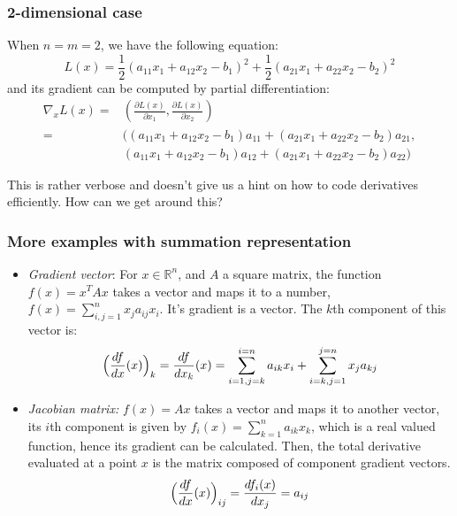 \documentclass{beamer}
\begin{document}
\begin{frame}
\frametitle{2-dimensional case}

When $n=m=2$, we have the following equation: \[L(x) = \frac{1}{2}(a_{11}x_1 + a_{12}x_2 -b_1)^2+\frac{1}{2}(a_{21}x_1 + a_{22}x_2 - b_2)^2\] and its gradient can be computed by partial differentiation:
\begin{align*}
    \nabla_xL(x) = &(\frac{\partial L(x)}{\partial x_1}, \frac{\partial L(x)}{\partial x_2}) \\
    = &((a_{11}x_1 + a_{12}x_2 -b_1)a_{11} + (a_{21}x_1 + a_{22}x_2 - b_2)a_{21}, \\
    &(a_{11}x_1 + a_{12}x_2 -b_1)a_{12} + (a_{21}x_1 + a_{22}x_2 - b_2)a_{22})
\end{align*}

This is rather verbose and doesn't give us a hint on how to code derivatives efficiently.
How can we get around this?

\end{frame}


\begin{frame}
\frametitle{More examples with summation representation}

\begin{itemize}
    \item \textit{Gradient vector}: For $x\in \mathbb{R}^n$, and $A$ a square matrix, the function $f(x)=x^TAx$ takes a vector and maps it to a number, $f(x) = \sum_{i,j=1}^nx_ja_{ij}x_i$. It's gradient is a vector. The $k$th component of this vector is:\[ \Big{(}\frac{df}{dx}(x) \Big{)}_k = \frac{df}{dx_k}(x) = \sum_{i=1, j=k}^{i=n}a_{ik}x_i + \sum_{i=k, j=1}^{j=n}x_ja_{kj} \]
    \item \textit{Jacobian matrix:} $f(x)=Ax$ takes a vector and maps it to another vector, its $i$th component is given by $f_i(x) = \sum_{k=1}^na_{ik}x_k $, which is a real valued function, hence its gradient can be calculated. Then, the total derivative evaluated at a point $x$ is the matrix composed of component gradient vectors. \[ \Big{(}\frac{df}{dx}(x)\Big{)}_{ij} = \frac{df_i(x)}{dx_j} = a_{ij} \]
\end{itemize}

\end{frame}

\end{document}

